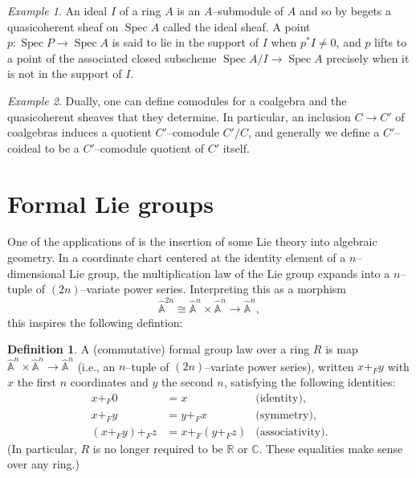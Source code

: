 \documentclass{amsart}
\newcommand{\A}{\widehat{\mathbb{A}}}
\newcommand{\<}{\langle}
\renewcommand{\>}{\rangle}
\DeclareMathOperator{\Spec}{Spec}
\theoremstyle{plain}
\theoremstyle{definition}
\newtheorem*{definition}{Definition}
\theoremstyle{remark}
\newtheorem*{example}{Example}
\begin{document}
\begin{example}
An ideal $I$ of a ring $A$ is an $A$--submodule of $A$ and so by  begets a quasicoherent sheaf on $\Spec A$ called the ideal sheaf.  A point $p: \Spec P \to \Spec A$ is said to lie in the support of $I$ when $p^* I \ne 0$, and $p$ lifts to a point of the associated closed subscheme $\Spec A/I \to \Spec A$ precisely when it is not in the support of $I$.
\end{example}

\begin{example}\label{DefnCoideal}
Dually, one can define comodules for a coalgebra and the quasicoherent sheaves that they determine.  In particular, an inclusion $C \to C'$ of coalgebras induces a quotient $C'$--comodule $C' / C$, and generally we define a $C'$--coideal to be a $C'$--comodule quotient of $C'$ itself.
\end{example}





\section{Formal Lie groups}\label{FormalLieGroups}

One of the applications of  is the insertion of some Lie theory into algebraic geometry.  In a coordinate chart centered at the identity element of a $n$--dimensional Lie group, the multiplication law of the Lie group expands into a $n$--tuple of $(2n)$--variate power series.  Interpreting this as a morphism \[\A^{2n} \cong \A^n \times \A^n \to \A^n,\] this inspires the following defintion:
\begin{definition}\label{DefinitionOfDimension}
A (commutative) formal group law over a ring $R$ is map $\A^n \times \A^n \to \A^n$ (i.e., an $n$--tuple of $(2n)$--variate power series), written $x +_F y$ with $x$ the first $n$ coordinates and $y$ the second $n$, satisfying the following identities:
\begin{align*}
x +_F 0 & = x & \text{(identity)}, \\
x +_F y & = y +_F x & \text{(symmetry)}, \\
(x +_F y) +_F z & = x +_F (y +_F z) & \text{(associativity)}.
\end{align*}
(In particular, $R$ is no longer required to be $\mathbb{R}$ or $\mathbb C$. These equalities make sense over any ring.)
\end{definition}
\end{document}
